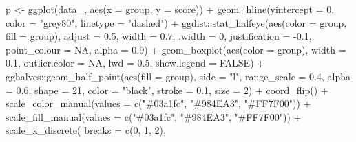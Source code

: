 \documentclass[
  11pt,
  oneside]{book}
\newenvironment{Shaded}{\begin{snugshade}}{\end{snugshade}}
\newcommand{\AttributeTok}[1]{\textcolor[rgb]{0.77,0.63,0.00}{#1}}
\newcommand{\ConstantTok}[1]{\textcolor[rgb]{0.00,0.00,0.00}{#1}}
\newcommand{\DecValTok}[1]{\textcolor[rgb]{0.00,0.00,0.81}{#1}}
\newcommand{\FloatTok}[1]{\textcolor[rgb]{0.00,0.00,0.81}{#1}}
\newcommand{\FunctionTok}[1]{\textcolor[rgb]{0.00,0.00,0.00}{#1}}
\newcommand{\NormalTok}[1]{#1}
\newcommand{\OtherTok}[1]{\textcolor[rgb]{0.56,0.35,0.01}{#1}}
\newcommand{\SpecialCharTok}[1]{\textcolor[rgb]{0.00,0.00,0.00}{#1}}
\newcommand{\StringTok}[1]{\textcolor[rgb]{0.31,0.60,0.02}{#1}}
\begin{document}
\begin{Shaded}
\begin{Highlighting}[]
\NormalTok{p }\OtherTok{\textless{}{-}} \FunctionTok{ggplot}\NormalTok{(data\_, }\FunctionTok{aes}\NormalTok{(}\AttributeTok{x =}\NormalTok{ group, }\AttributeTok{y =}\NormalTok{ score)) }\SpecialCharTok{+}
  \FunctionTok{geom\_hline}\NormalTok{(}\AttributeTok{yintercept =} \DecValTok{0}\NormalTok{, }\AttributeTok{color =} \StringTok{"grey80"}\NormalTok{, }\AttributeTok{linetype =} \StringTok{"dashed"}\NormalTok{) }\SpecialCharTok{+}
\NormalTok{  ggdist}\SpecialCharTok{::}\FunctionTok{stat\_halfeye}\NormalTok{(}\FunctionTok{aes}\NormalTok{(}\AttributeTok{color =}\NormalTok{ group, }\AttributeTok{fill =}\NormalTok{ group), }\AttributeTok{adjust =} \FloatTok{0.5}\NormalTok{, }\AttributeTok{width =} \FloatTok{0.7}\NormalTok{, }\AttributeTok{.width =} \DecValTok{0}\NormalTok{, }\AttributeTok{justification =} \SpecialCharTok{{-}}\FloatTok{0.1}\NormalTok{, }\AttributeTok{point\_colour =} \ConstantTok{NA}\NormalTok{, }\AttributeTok{alpha =} \FloatTok{0.9}\NormalTok{) }\SpecialCharTok{+}
  \FunctionTok{geom\_boxplot}\NormalTok{(}\FunctionTok{aes}\NormalTok{(}\AttributeTok{color =}\NormalTok{ group), }\AttributeTok{width =} \FloatTok{0.1}\NormalTok{, }\AttributeTok{outlier.color =} \ConstantTok{NA}\NormalTok{, }\AttributeTok{lwd =} \FloatTok{0.5}\NormalTok{, }\AttributeTok{show.legend =} \ConstantTok{FALSE}\NormalTok{) }\SpecialCharTok{+}
\NormalTok{  gghalves}\SpecialCharTok{::}\FunctionTok{geom\_half\_point}\NormalTok{(}\FunctionTok{aes}\NormalTok{(}\AttributeTok{fill =}\NormalTok{ group), }\AttributeTok{side =} \StringTok{"l"}\NormalTok{, }\AttributeTok{range\_scale =} \FloatTok{0.4}\NormalTok{, }\AttributeTok{alpha =} \FloatTok{0.6}\NormalTok{, }\AttributeTok{shape =} \DecValTok{21}\NormalTok{, }\AttributeTok{color =} \StringTok{"black"}\NormalTok{, }\AttributeTok{stroke =} \FloatTok{0.1}\NormalTok{, }\AttributeTok{size =} \DecValTok{2}\NormalTok{) }\SpecialCharTok{+}
  \FunctionTok{coord\_flip}\NormalTok{() }\SpecialCharTok{+}
  \FunctionTok{scale\_color\_manual}\NormalTok{(}\AttributeTok{values =} \FunctionTok{c}\NormalTok{(}\StringTok{"\#03a1fc"}\NormalTok{, }\StringTok{"\#984EA3"}\NormalTok{, }\StringTok{"\#FF7F00"}\NormalTok{)) }\SpecialCharTok{+}
  \FunctionTok{scale\_fill\_manual}\NormalTok{(}\AttributeTok{values =} \FunctionTok{c}\NormalTok{(}\StringTok{"\#03a1fc"}\NormalTok{, }\StringTok{"\#984EA3"}\NormalTok{, }\StringTok{"\#FF7F00"}\NormalTok{)) }\SpecialCharTok{+}
  \FunctionTok{scale\_x\_discrete}\NormalTok{(}
    \AttributeTok{breaks =} \FunctionTok{c}\NormalTok{(}\DecValTok{0}\NormalTok{, }\DecValTok{1}\NormalTok{, }\DecValTok{2}\NormalTok{),}

\end{Highlighting}
\end{Shaded}
\end{document}
